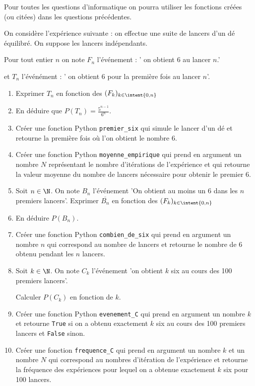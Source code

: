 \begin{exercice}
Pour toutes les questions d'informatique on pourra utiliser les fonctions créées (ou citées) dans les questions précédentes. 

On considère l'expérience suivante : on effectue une suite de lancers d'un dé  équilibré. On suppose les lancers indépendants. 

Pour tout entier $n$ on note $F_n $ l'événement 
: ' on obtient 6 au  lancer $n$.' 

et $T_n$ l'événément : ' on obtient 6 pour la première fois au lancer $n$'.

\begin{enumerate}
\item Exprimer $T_n$ en fonction des $(F_k)_{k\in \intent{0,n}}$
\item En déduire que $P(T_n) = \frac{5^{n-1} }{6^n}$. 
\item Créer une fonction Python \texttt{premier\_six} qui simule le lancer d'un dé et retourne la première fois où l'on obtient le nombre 6. 
\item Créer une fonction Python \texttt{moyenne\_empirique} qui prend en argument un nombre $N$ représentant le nombre d'itérations de l'expérience et qui retourne la valeur moyenne du nombre de lancers nécessaire pour obtenir le premier 6. 
\item Soit $n\in \N$. On note $B_n$ l'événement 'On obtient  au moins un 6 dans les $n$ premiers lancers'. Exprimer $\overline{B_n}$  en fonction des $(F_k)_{k\in \intent{0,n}}$
\item En déduire $P(B_n)$. 
\item Créer une fonction  Python \texttt{combien\_de\_six} qui prend en argument un nombre $n$ qui correspond au nombre de lancers et retourne le nombre de $6$ obtenu pendant les $n$ lancers. 

\item Soit $k\in \N$. On note $C_k$ l'événement 'on obtient $k$ six au cours des 100 premiers lancers'.

 Calculer $P(C_k)$ en fonction de $k$. 
\item Créer une fonction Python \texttt{evenement\_C} qui prend en argument un nombre $k$ et retourne \texttt{True} si on a obtenu exactement $k$ six au cours des 100 premiers lancers et \texttt{False} sinon. 
\item Créer une fonction \texttt{frequence\_C} qui prend en argument un nombre $k$ et un nombre $N$ qui correspond au nombres d'itération de l'expérience et  retourne la fréquence des expériences pour lequel on a obtenue exactement $k$ six pour 100 lancers. 

\end{enumerate}

\end{exercice}


